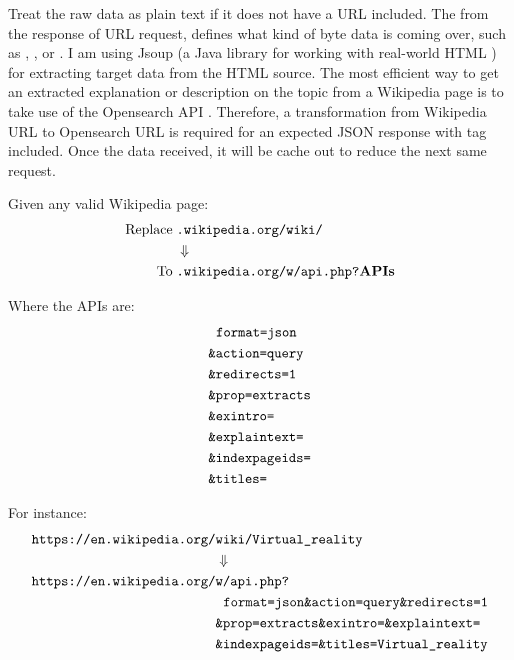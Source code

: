Treat the raw data as plain text if it does not have a URL included. The\; from the response of URL request, defines what kind of byte data is coming over, such as , , or . I am using Jsoup (a Java library for working with real-world HTML \cite{joup.2016}) for extracting target data from the HTML source. The most efficient way to get an extracted explanation or description on the topic from a Wikipedia page is to take use of the Opensearch API \cite{wiki.api.2016}. Therefore, a transformation from Wikipedia URL to Opensearch URL is required for an expected JSON response with  tag included. Once the data received, it will be cache out to reduce the next same request.

Given any valid Wikipedia page:
\[
\begin{array}{lr}
\begin{aligned}
\text{Replace}\;&\texttt{.wikipedia.org/wiki/}\\
&\Downarrow\\
\text{To}\;&\texttt{.wikipedia.org/w/api.php?}\mathbf{APIs}\\
\end{aligned}
\end{array}
\]

Where the APIs are:
\[
\begin{array}{lr}
\begin{aligned}
&\;\;\texttt{format=json}\\
&\texttt{\&action=query}\\
&\texttt{\&redirects=1}\\
&\texttt{\&prop=extracts}\\
&\texttt{\&exintro=}\\
&\texttt{\&explaintext=}\\
&\texttt{\&indexpageids=}\\
&\texttt{\&titles=}\\
\end{aligned}
\end{array}
\]

For instance:
\[
\begin{array}{lr}
\begin{aligned}
\texttt{https://en.wikipedia.org/}&\texttt{wiki/Virtual\_reality}\\
&\Downarrow\\
\texttt{https://en.wikipedia.org/}&\texttt{w/api.php?}\\
&\;\;\texttt{format=json\&action=query\&redirects=1}\\
&\texttt{\&prop=extracts\&exintro=\&explaintext=}\\
&\texttt{\&indexpageids=\&titles=Virtual\_reality}\\
\end{aligned}
\end{array}
\]

